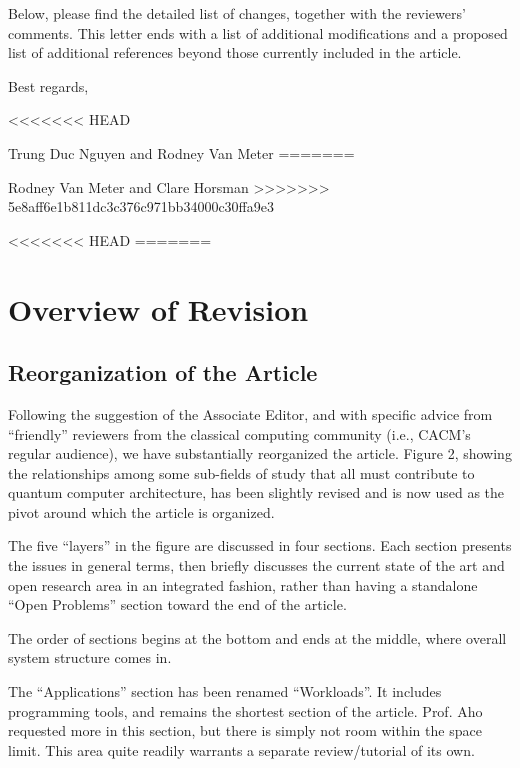 \documentclass{article}
\begin{document}
Below, please find the detailed list of changes, together with the
reviewers' comments.  This letter ends with a list of additional
modifications and a proposed list of additional references beyond
those currently included in the article.

\medskip\noindent Best regards,

\begin{list}{}{\setlength{\itemsep}{0mm}}
<<<<<<< HEAD
\item Trung Duc Nguyen and Rodney Van Meter
=======
\item Rodney Van Meter and Clare Horsman
>>>>>>> 5e8aff6e1b811dc3c376c971bb34000c30ffa9e3
\end{list}

\cleardoublepage

<<<<<<< HEAD
=======
\section{Overview of Revision}

\subsection{Reorganization of the Article}
\label{sec:rearch}

Following the suggestion of the Associate Editor, and with specific
advice from ``friendly'' reviewers from the classical computing
community (i.e., CACM's regular audience), we have substantially
reorganized the article.  Figure 2, showing the relationships among
some sub-fields of study that all must contribute to quantum computer
architecture, has been slightly revised and is now used as the pivot
around which the article is organized.

The five ``layers'' in the figure are discussed in four sections.
Each section presents the issues in general terms, then briefly
discusses the current state of the art and open research area in an
integrated fashion, rather than having a standalone ``Open Problems''
section toward the end of the article.

The order of sections begins at the bottom and ends at the middle,
where overall system structure comes in.

The ``Applications'' section has been renamed ``Workloads''.  It
includes programming tools, and remains the shortest section of the
article.  Prof. Aho requested more in this section, but there is
simply not room within the space limit.  This area quite readily
warrants a separate review/tutorial of its own.
\end{document}

